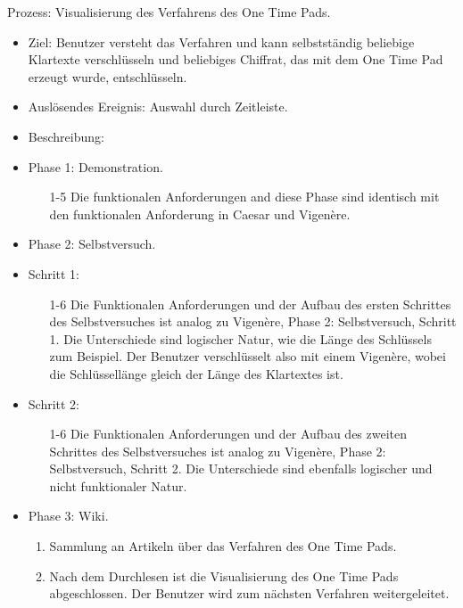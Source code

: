 \documentclass{article}
\begin{document}
\begin{FA}[start=800]
 \item Prozess: Visualisierung des Verfahrens des One Time Pads.
\end{FA}
\begin{itemize}[label={}]

 \item Ziel: Benutzer versteht das Verfahren und kann selbstständig beliebige Klartexte verschlüsseln und beliebiges Chiffrat, das mit dem One Time Pad erzeugt wurde, entschlüsseln.

 \item Auslösendes Ereignis: Auswahl durch Zeitleiste.

 \item Beschreibung:

 \item Phase 1: Demonstration.

	\begin{enumerate}[]
 	 \item[1-5] Die funktionalen Anforderungen and diese Phase sind identisch mit den 
            funktionalen Anforderung in Caesar und Vigenère.
	\end{enumerate}

 \item Phase 2: Selbstversuch.

 \item Schritt 1:

	\begin{enumerate}
	 \item[1-6] Die Funktionalen Anforderungen und der Aufbau des ersten 
Schrittes des Selbstversuches ist analog zu Vigenère, Phase 2: Selbstversuch, 
Schritt 1. Die Unterschiede sind logischer Natur, wie die Länge des 
Schlüssels zum Beispiel. Der Benutzer verschlüsselt also mit einem 
Vigenère, wobei die Schlüssellänge gleich der Länge des Klartextes ist.
	\end{enumerate}

 \item Schritt 2:

	\begin{enumerate}
	 \item[1-6] Die Funktionalen Anforderungen und der Aufbau des zweiten 
Schrittes des Selbstversuches ist analog zu Vigenère, Phase 2: Selbstversuch, 
Schritt 2. Die Unterschiede sind ebenfalls logischer und nicht funktionaler Natur.
	\end{enumerate}

 \item Phase 3: Wiki.

	\begin{enumerate}
	 \item Sammlung an Artikeln über das Verfahren des One Time Pads.
	 \item Nach dem Durchlesen ist die Visualisierung des One Time Pads abgeschlossen. Der Benutzer wird zum nächsten Verfahren weitergeleitet.
 	\end{enumerate}

\end{itemize}
\end{document}

